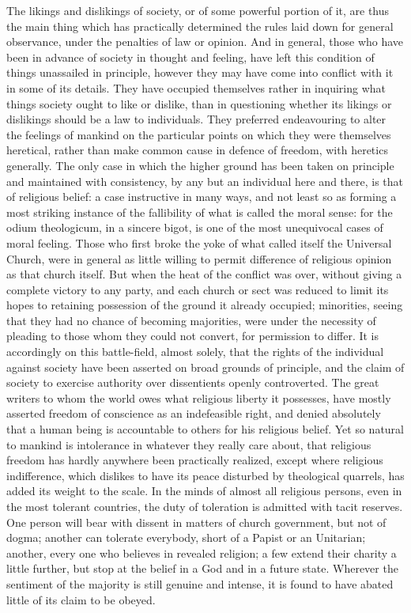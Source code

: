 \documentclass[12pt]{report}
\begin{document}
The likings and dislikings of society, or of some powerful portion of it, are thus the main thing which has practically determined the rules laid down for general observance, under the penalties of law or opinion. And in general, those who have been in advance of society in thought and feeling, have left this condition of things unassailed in principle, however they may have come into conflict with it in some of its details. They have occupied themselves rather in inquiring what things society ought to like or dislike, than in questioning whether its likings or dislikings should be a law to individuals. They preferred endeavouring to alter the feelings of mankind on the particular points on which they were themselves heretical, rather than make common cause in defence of freedom, with heretics generally. The only case in which the higher ground has been taken on principle and maintained with consistency, by any but an individual here and there, is that of religious belief: a case instructive in many ways, and not least so as forming a most striking instance of the fallibility of what is called the moral sense: for the odium theologicum, in a sincere bigot, is one of the most unequivocal cases of moral feeling. Those who first broke the yoke of what called itself the Universal Church, were in general as little willing to permit difference of religious opinion as that church itself. But when the heat of the conflict was over, without giving a complete victory to any party, and each church or sect was reduced to limit its hopes to retaining possession of the ground it already occupied; minorities, seeing that they had no chance of becoming majorities, were under the necessity of pleading to those whom they could not convert, for permission to differ. It is accordingly on this battle-field, almost solely, that the rights of the individual against society have been asserted on broad grounds of principle, and the claim of society to exercise authority over dissentients openly controverted. The great writers to whom the world owes what religious liberty it possesses, have mostly asserted freedom of conscience as an indefeasible right, and denied absolutely that a human being is accountable to others for his religious belief. Yet so natural to mankind is intolerance in whatever they really care about, that religious freedom has hardly anywhere been practically realized, except where religious indifference, which dislikes to have its peace disturbed by theological quarrels, has added its weight to the scale. In the minds of almost all religious persons, even in the most tolerant countries, the duty of toleration is admitted with tacit reserves. One person will bear with dissent in matters of church government, but not of dogma; another can tolerate everybody, short of a Papist or an Unitarian; another, every one who believes in revealed religion; a few extend their charity a little further, but stop at the belief in a God and in a future state. Wherever the sentiment of the majority is still genuine and intense, it is found to have abated little of its claim to be obeyed.
\end{document}
